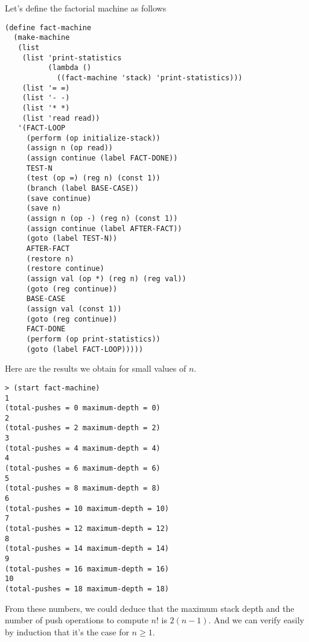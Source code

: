 \documentclass[a4paper,12pt]{article}
\begin{document}
Let's define the factorial machine as follows

\begin{lstlisting}
(define fact-machine
  (make-machine
   (list
    (list 'print-statistics
          (lambda ()
            ((fact-machine 'stack) 'print-statistics)))
    (list '= =)
    (list '- -)
    (list '* *)
    (list 'read read))
   '(FACT-LOOP
     (perform (op initialize-stack))
     (assign n (op read))
     (assign continue (label FACT-DONE))
     TEST-N
     (test (op =) (reg n) (const 1))
     (branch (label BASE-CASE))
     (save continue)
     (save n)
     (assign n (op -) (reg n) (const 1))
     (assign continue (label AFTER-FACT))
     (goto (label TEST-N))
     AFTER-FACT
     (restore n)
     (restore continue)
     (assign val (op *) (reg n) (reg val))
     (goto (reg continue))
     BASE-CASE
     (assign val (const 1))
     (goto (reg continue))
     FACT-DONE
     (perform (op print-statistics))
     (goto (label FACT-LOOP)))))
\end{lstlisting}

Here are the results we obtain for small values of $n$.

\begin{lstlisting}
> (start fact-machine)
1
(total-pushes = 0 maximum-depth = 0)
2
(total-pushes = 2 maximum-depth = 2)
3
(total-pushes = 4 maximum-depth = 4)
4
(total-pushes = 6 maximum-depth = 6)
5
(total-pushes = 8 maximum-depth = 8)
6
(total-pushes = 10 maximum-depth = 10)
7
(total-pushes = 12 maximum-depth = 12)
8
(total-pushes = 14 maximum-depth = 14)
9
(total-pushes = 16 maximum-depth = 16)
10
(total-pushes = 18 maximum-depth = 18)
\end{lstlisting}

From these numbers, we could deduce that the maximum stack depth and
the number of push operations to compute $n!$ is $2(n-1)$.  And we can
verify easily by induction that it's the case for $n\ge1$.
\end{document}
